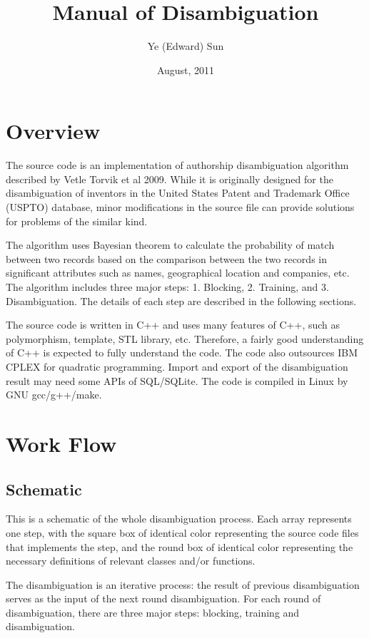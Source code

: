 \documentclass{article}
\begin{document}
\title{Manual of Disambiguation}
\author{Ye (Edward) Sun}
\date{August, 2011}
\maketitle

\section{Overview}

The source code is an implementation of authorship 
disambiguation algorithm described by Vetle
Torvik et al 2009. While it is originally designed 
for the disambiguation of inventors in the United
States Patent and Trademark Office (USPTO) database, 
minor modifications in the source file can
provide solutions for problems of the similar kind.

The algorithm uses Bayesian theorem to calculate the 
probability of match between two records based
on the comparison between the two records in significant 
attributes such as names, geographical location and companies, 
etc. The algorithm includes three major steps: 1. Blocking,
2. Training, and 3. Disambiguation.  The details of each 
step are described in the following sections.

The source code is written in C++ and uses many features 
of C++, such as polymorphism, template, STL library, etc. 
Therefore, a fairly good understanding of C++ is expected 
to fully understand the code. The code also outsources 
IBM CPLEX for quadratic programming. Import and export of the
disambiguation result may need some APIs of SQL/SQLite. 
The code is compiled in Linux by GNU gcc/g++/make.


\section{Work Flow}

\subsection{Schematic}

This is a schematic of the whole disambiguation process. 
Each array represents one step, with the
square box of identical color representing the source 
code files that implements the step, and the round
box of identical color representing the necessary 
definitions of relevant classes and/or functions.


The disambiguation is an iterative process: 
the result of previous disambiguation serves as the input of
the next round disambiguation. For each round of disambiguation, 
there are three major steps: blocking, training and disambiguation.
\end{document}
